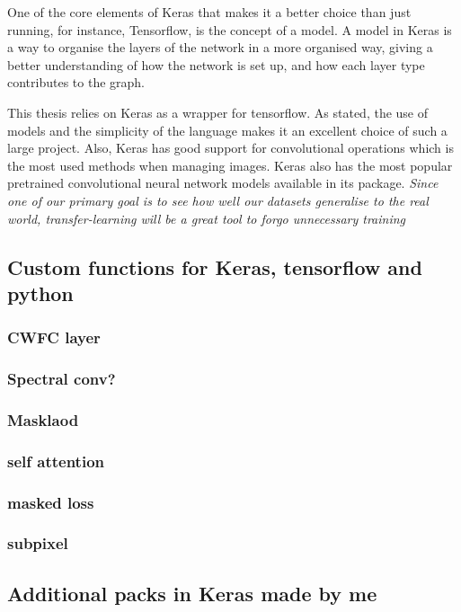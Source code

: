 One of the core elements of Keras that makes it a better choice than just running, for instance, Tensorflow, is the concept of a model. A model in Keras is a way to organise the layers of the network in a more organised way, giving a better understanding of how the network is set up, and how each layer type contributes to the graph. 

This thesis relies on Keras as a wrapper for tensorflow. As stated, the use of models and the simplicity of the language makes it an excellent choice of such a large project. Also, Keras has good support for convolutional operations which is the most used methods when managing images. Keras also has the most popular pretrained convolutional neural network models available in its package. \textit{Since one of our primary goal is to see how well our datasets generalise to the real world, transfer-learning will be a great tool to forgo unnecessary training}




\subsection{Custom functions for Keras, tensorflow and python}
\subsubsection{CWFC layer}
\subsubsection{Spectral conv?}
\subsubsection{Masklaod}
\subsubsection{self attention}
\subsubsection{masked loss}
\subsubsection{subpixel}
    
\subsection{Additional packs in Keras made by me}

